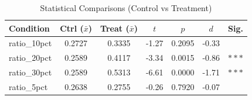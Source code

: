\begin{table}[htbp]
\centering
\caption{Statistical Comparisons (Control vs Treatment)}
\label{tab:stats}
\begin{tabular}{lcccccc}
\toprule
Condition & Ctrl ($\bar{x}$) & Treat ($\bar{x}$) & $t$ & $p$ & $d$ & Sig. \\
\midrule
  ratio\_10pct & 0.2727 & 0.3335 & -1.27 & 0.2095 & -0.33 &  \\
  ratio\_20pct & 0.2589 & 0.4117 & -3.34 & 0.0015 & -0.86 & $***$ \\
  ratio\_30pct & 0.2589 & 0.5313 & -6.61 & 0.0000 & -1.71 & $***$ \\
  ratio\_5pct & 0.2638 & 0.2755 & -0.26 & 0.7920 & -0.07 &  \\
\bottomrule
\end{tabular}
\end{table}